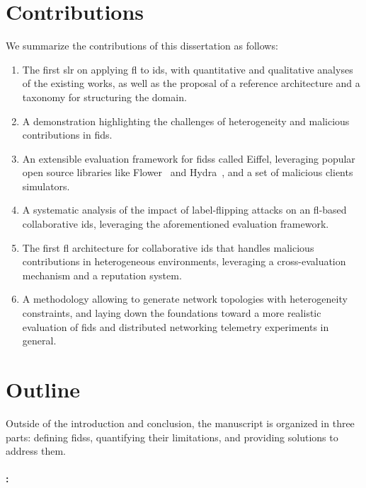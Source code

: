 \section{Contributions\label{sec:intro.contributions}}

We summarize the contributions of this dissertation as follows:

\begin{enumerate}
  \item The first \gls{slr} on applying \gls{fl} to \gls{ids}, with quantitative and qualitative analyses of the existing works, as well as the proposal of a reference architecture and a taxonomy for structuring the domain.
  \item A demonstration highlighting the challenges of heterogeneity and malicious contributions in \gls{fids}.
  \item An extensible evaluation framework for \glspl{fids} called Eiffel, leveraging popular open source libraries like Flower~\cite{beutel_Flowerfriendlyfederated_2020} and Hydra~\cite{Hydra}, and a set of malicious clients simulators. 
  \item A systematic analysis of the impact of label-flipping attacks on an \gls{fl}-based collaborative \gls{ids}, leveraging the aforementioned evaluation framework.
  \item The first \gls{fl} architecture for collaborative \gls{ids} that handles malicious contributions in heterogeneous environments, leveraging a cross-evaluation mechanism and a reputation system.
  \item A methodology allowing to generate network topologies with heterogeneity constraints, and laying down the foundations toward a more realistic evaluation of \gls{fids} and distributed networking telemetry experiments in general.
\end{enumerate}


\section{Outline\label{sec:intro.outline}}

Outside of the introduction and conclusion, the manuscript is organized in three parts: defining \glspl{fids}, quantifying their limitations, and providing solutions to address them.

\paragraph{:}

